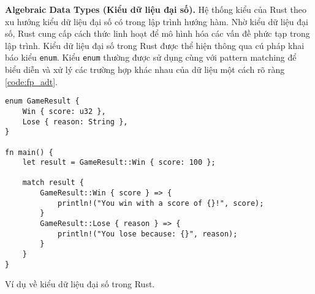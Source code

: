 
\textbf{Algebraic Data Types (Kiểu dữ liệu đại số).} Hệ thống kiểu của Rust theo xu hướng kiểu dữ liệu đại số có trong lập trình hướng hàm.
Nhờ kiểu dữ liệu đại số, Rust cung cấp cách thức linh hoạt để mô hình hóa các vấn đề phức tạp trong lập trình.
Kiểu dữ liệu đại số trong Rust được thể hiện thông qua cú pháp khai báo kiểu \texttt{enum}.
Kiểu \texttt{enum} thường được sử dụng cùng với pattern matching để biểu diễn và xử lý các trường hợp khác nhau của dữ liệu một cách rõ ràng \ref{code:fp_adt}.

\begin{listing}[H]
\begin{verbatim}
enum GameResult {
    Win { score: u32 },
    Lose { reason: String },
}

fn main() {
    let result = GameResult::Win { score: 100 };

    match result {
        GameResult::Win { score } => {
            println!("You win with a score of {}!", score);
        }
        GameResult::Lose { reason } => {
            println!("You lose because: {}", reason);
        }
    }
}
\end{verbatim}
\caption{Ví dụ về kiểu dữ liệu đại số trong Rust.}
\label{code:fp_adt}
\end{listing}
